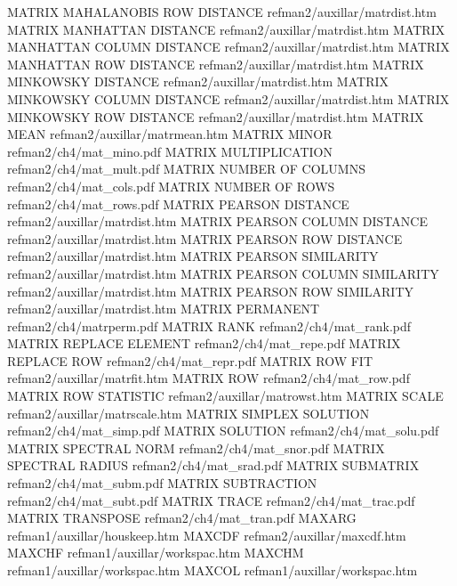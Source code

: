 MATRIX MAHALANOBIS ROW DISTANCE         refman2/auxillar/matrdist.htm
MATRIX MANHATTAN DISTANCE               refman2/auxillar/matrdist.htm
MATRIX MANHATTAN COLUMN DISTANCE        refman2/auxillar/matrdist.htm
MATRIX MANHATTAN ROW DISTANCE           refman2/auxillar/matrdist.htm
MATRIX MINKOWSKY DISTANCE               refman2/auxillar/matrdist.htm
MATRIX MINKOWSKY COLUMN DISTANCE        refman2/auxillar/matrdist.htm
MATRIX MINKOWSKY ROW DISTANCE           refman2/auxillar/matrdist.htm
MATRIX MEAN                             refman2/auxillar/matrmean.htm
MATRIX MINOR                            refman2/ch4/mat_mino.pdf
MATRIX MULTIPLICATION                   refman2/ch4/mat_mult.pdf
MATRIX NUMBER OF COLUMNS                refman2/ch4/mat_cols.pdf
MATRIX NUMBER OF ROWS                   refman2/ch4/mat_rows.pdf
MATRIX PEARSON DISTANCE                 refman2/auxillar/matrdist.htm
MATRIX PEARSON COLUMN DISTANCE          refman2/auxillar/matrdist.htm
MATRIX PEARSON ROW DISTANCE             refman2/auxillar/matrdist.htm
MATRIX PEARSON SIMILARITY               refman2/auxillar/matrdist.htm
MATRIX PEARSON COLUMN SIMILARITY        refman2/auxillar/matrdist.htm
MATRIX PEARSON ROW SIMILARITY           refman2/auxillar/matrdist.htm
MATRIX PERMANENT                        refman2/ch4/matrperm.pdf
MATRIX RANK                             refman2/ch4/mat_rank.pdf
MATRIX REPLACE ELEMENT                  refman2/ch4/mat_repe.pdf
MATRIX REPLACE ROW                      refman2/ch4/mat_repr.pdf
MATRIX ROW FIT                          refman2/auxillar/matrfit.htm
MATRIX ROW                              refman2/ch4/mat_row.pdf
MATRIX ROW STATISTIC                    refman2/auxillar/matrowst.htm
MATRIX SCALE                            refman2/auxillar/matrscale.htm
MATRIX SIMPLEX SOLUTION                 refman2/ch4/mat_simp.pdf
MATRIX SOLUTION                         refman2/ch4/mat_solu.pdf
MATRIX SPECTRAL NORM                    refman2/ch4/mat_snor.pdf
MATRIX SPECTRAL RADIUS                  refman2/ch4/mat_srad.pdf
MATRIX SUBMATRIX                        refman2/ch4/mat_subm.pdf
MATRIX SUBTRACTION                      refman2/ch4/mat_subt.pdf
MATRIX TRACE                            refman2/ch4/mat_trac.pdf
MATRIX TRANSPOSE                        refman2/ch4/mat_tran.pdf
MAXARG                                  refman1/auxillar/houskeep.htm
MAXCDF                                  refman2/auxillar/maxcdf.htm
MAXCHF                                  refman1/auxillar/workspac.htm
MAXCHM                                  refman1/auxillar/workspac.htm
MAXCOL                                  refman1/auxillar/workspac.htm
